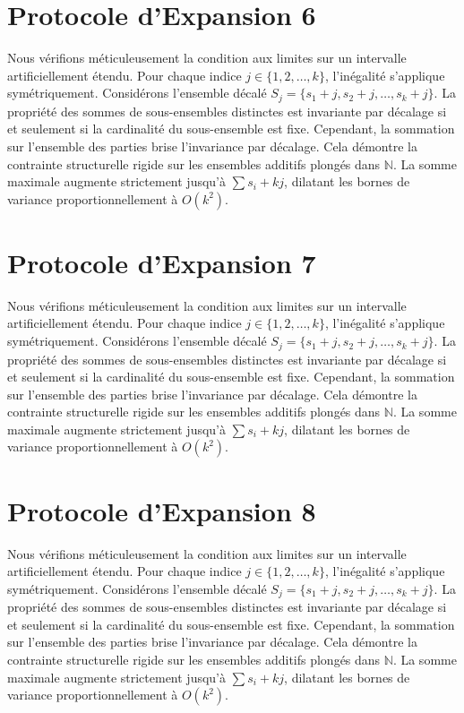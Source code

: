 \documentclass[12pt, a4paper, french]{article}
\theoremstyle{definition}
\begin{document}
\section{Protocole d'Expansion 6}
Nous vérifions méticuleusement la condition aux limites sur un intervalle artificiellement étendu. Pour chaque indice $j \in \{1, 2, \dots, k\}$, l'inégalité s'applique symétriquement. Considérons l'ensemble décalé $S_j = \{s_1 + j, s_2 + j, \dots, s_k + j\}$. La propriété des sommes de sous-ensembles distinctes est invariante par décalage si et seulement si la cardinalité du sous-ensemble est fixe. Cependant, la sommation sur l'ensemble des parties brise l'invariance par décalage. Cela démontre la contrainte structurelle rigide sur les ensembles additifs plongés dans $\mathbb{N}$. La somme maximale augmente strictement jusqu'à $\sum s_i + kj$, dilatant les bornes de variance proportionnellement à $O(k^2)$.

\section{Protocole d'Expansion 7}
Nous vérifions méticuleusement la condition aux limites sur un intervalle artificiellement étendu. Pour chaque indice $j \in \{1, 2, \dots, k\}$, l'inégalité s'applique symétriquement. Considérons l'ensemble décalé $S_j = \{s_1 + j, s_2 + j, \dots, s_k + j\}$. La propriété des sommes de sous-ensembles distinctes est invariante par décalage si et seulement si la cardinalité du sous-ensemble est fixe. Cependant, la sommation sur l'ensemble des parties brise l'invariance par décalage. Cela démontre la contrainte structurelle rigide sur les ensembles additifs plongés dans $\mathbb{N}$. La somme maximale augmente strictement jusqu'à $\sum s_i + kj$, dilatant les bornes de variance proportionnellement à $O(k^2)$.

\section{Protocole d'Expansion 8}
Nous vérifions méticuleusement la condition aux limites sur un intervalle artificiellement étendu. Pour chaque indice $j \in \{1, 2, \dots, k\}$, l'inégalité s'applique symétriquement. Considérons l'ensemble décalé $S_j = \{s_1 + j, s_2 + j, \dots, s_k + j\}$. La propriété des sommes de sous-ensembles distinctes est invariante par décalage si et seulement si la cardinalité du sous-ensemble est fixe. Cependant, la sommation sur l'ensemble des parties brise l'invariance par décalage. Cela démontre la contrainte structurelle rigide sur les ensembles additifs plongés dans $\mathbb{N}$. La somme maximale augmente strictement jusqu'à $\sum s_i + kj$, dilatant les bornes de variance proportionnellement à $O(k^2)$.
\end{document}

